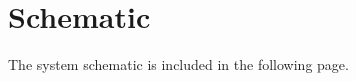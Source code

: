 \section{Schematic}
\label{ap:schematic}

The system schematic is included in the following page.



